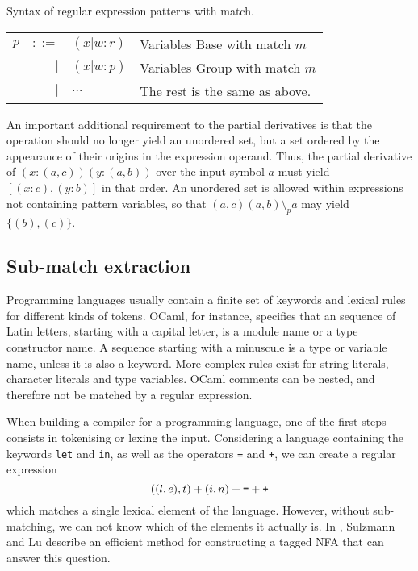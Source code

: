 \begin{defn}
   \label{defn-pat-with-match}
   Syntax of regular expression patterns with match.

   \begin{tabular}{lrll}
      $p$	& $::=$	& $(x|w:r)$	& Variables Base  with match $m$	\\
		& $|$	& $(x|w:p)$	& Variables Group with match $m$	\\
		& $|$	& $\dots$	& The rest is the same as above.	\\
   \end{tabular}
\end{defn}

An important additional requirement to the partial derivatives is that the
operation should no longer yield an unordered set, but a set ordered by the
appearance of their origins in the expression operand. Thus, the partial
derivative of $(x:(a,c))(y:(a,b))$ over the input symbol $a$ must yield
$[(x:c),(y:b)]$ in that order. An unordered set is allowed within expressions
not containing pattern variables, so that $(a,c)(a,b) \setminus_p a$ may yield
$\{(b),(c)\}$.

\subsection{Sub-match extraction}

Programming languages usually contain a finite set of keywords and lexical rules
for different kinds of tokens. OCaml, for instance, specifies that an sequence
of Latin letters, starting with a capital letter, is a module name or a type
constructor name. A sequence starting with a minuscule is a type or variable
name, unless it is also a keyword. More complex rules exist for string literals,
character literals and type variables. OCaml comments can be nested, and
therefore not be matched by a regular expression.

When building a compiler for a programming language, one of the first steps
consists in tokenising or lexing the input. Considering a language containing
the keywords \verb!let! and \verb!in!, as well as the operators \verb!=! and
\verb!+!, we can create a regular expression
%
\[((l,e),t) + (i,n) + \verb'=' + \verb'+'\]
%
which matches a single lexical element of the language. However, without
sub-matching, we can not know which of the elements it actually is. In
\cite{pdpat}, Sulzmann and Lu describe an efficient method for constructing a
tagged NFA that can answer this question.

